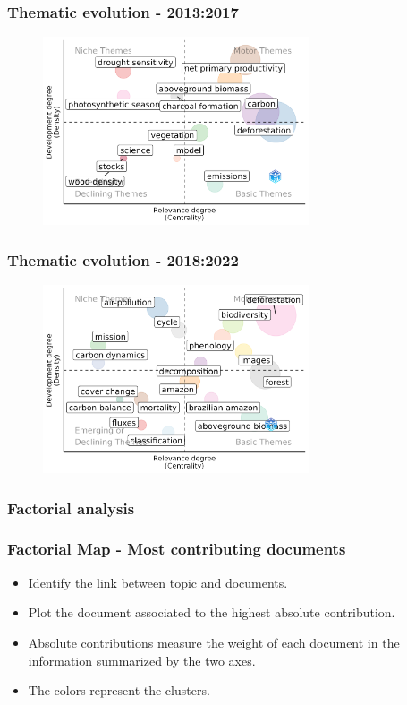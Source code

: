 \documentclass[aspectratio=169]{beamer}
\begin{document}
\begin{frame}
	\frametitle{Thematic evolution - 2013:2017}
    \begin{figure}
        \centering
        \includegraphics[width=0.7\textwidth]{figures/thematic_evolution_3.png}
    \end{figure}
\end{frame}

\begin{frame}
	\frametitle{Thematic evolution - 2018:2022}
    \begin{figure}
        \centering
        \includegraphics[width=0.7\textwidth]{figures/thematic_evolution_4.png}
    \end{figure}
\end{frame}


\subsubsection{Factorial analysis}


\begin{frame}
	\frametitle{Factorial Map - Most contributing documents}
	\begin{itemize}
		\item Identify the link between topic and documents.
		\item Plot the document associated to the highest absolute contribution.
		\item Absolute contributions measure the weight of each document in
		      the information summarized by the two axes.
		\item The colors represent the clusters.
	\end{itemize}
\end{frame}
\end{document}
